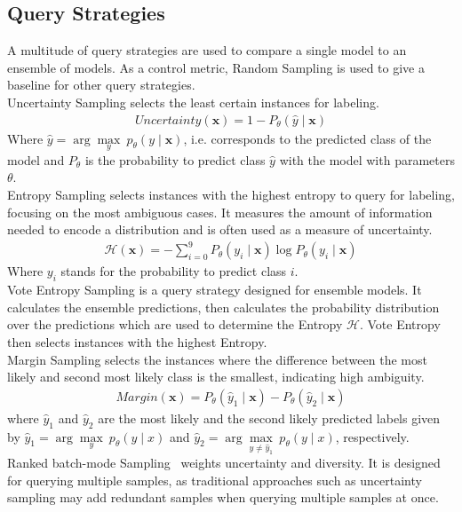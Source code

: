 \documentclass{article}
\theoremstyle{plain}
\theoremstyle{definition}
\theoremstyle{remark}
\begin{document}
\subsection{Query Strategies}
A multitude of query strategies are used to compare a single model to an ensemble of models. As a control metric, Random Sampling is used to give a baseline for other query strategies.\\
Uncertainty Sampling selects the least certain instances for labeling.
\begin{align}
	Uncertainty(\mathbf{x})=1-P_\theta(\hat{y} \mid \mathbf{x})
\end{align}
Where $\hat{y}=\operatorname{arg}\underset{y}{\operatorname{max}} \ p_\theta(y \mid \mathbf{x})$, i.e. corresponds to the predicted class of the model and $P_\theta$ is the probability to predict class $\hat{y}$ with the model with parameters $\theta$. \\
Entropy Sampling selects instances with the highest entropy to query for labeling, focusing on the most ambiguous cases. It measures the amount of information needed to encode a distribution and is often used as a measure of uncertainty.
\begin{align}
	\mathcal{H}(\mathbf{x})=-\sum_{i=0}^{9} P_\theta(y_i \mid \mathbf{x}) \log P_\theta(y_i \mid \mathbf{x})
\end{align}
Where $y_i$ stands for the probability to predict class $i$. \\
Vote Entropy Sampling is a query strategy designed for ensemble models. It calculates the ensemble predictions, then calculates the probability distribution over the predictions which are used to determine the Entropy $\mathcal{H}$. Vote Entropy then selects instances with the highest Entropy. \\
Margin Sampling selects the instances where the difference between the most likely and second most likely class is the smallest, indicating high ambiguity.
\begin{align}
	Margin(\mathbf{x})=P_\theta\left(\hat{y}_1 \mid \mathbf{x}\right)-P_\theta\left(\hat{y}_2 \mid \mathbf{x}\right)
\end{align}
where $\hat{y}_1$ and $\hat{y}_2$ are the most likely and the second likely predicted labels given by $\hat{y}_1=\operatorname{arg}\underset{y}{\operatorname{max}} \  p_\theta(y \mid x)$ and $\hat{y}_2=\operatorname{arg}\underset{y \neq \hat{y}_1}{\operatorname{max}} \  p_\theta(y \mid x)$, respectively. \\
Ranked batch-mode Sampling~\cite{ranked_batch_mode_query_strategy} weights uncertainty and diversity. It is designed for querying multiple samples, as traditional approaches such as uncertainty sampling may add redundant samples when querying multiple samples at once. \\
\end{document}

